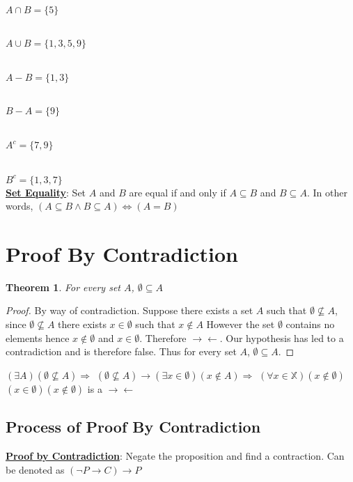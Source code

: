 \documentclass[12pt]{article}
\newtheorem{theorem}{Theorem}[section]
\newcommand{\defline}[2]{\noindent\textbf{\underline{#1}}: #2\\}
\newcommand{\contradiction}{$\rightarrow\leftarrow$}
\begin{document}
                \\$A \cap B = \{5\}$

                \\$A \cup B = \{1, 3, 5, 9\}$

                \\$A - B = \{1,3\}$

                \\$B - A = \{9\}$

                \\$A^c =\{7, 9\}$

                \\$B^c = \{1, 3,7\}$\\


            \defline{Set Equality}{Set $A$ and $B$ are equal if and only if $A\subseteq B$ and $B \subseteq A$. In other words, $(A\subseteq B \wedge B\subseteq A) \iff (A = B)$}

    \newpage

    \section{Proof By Contradiction}
        \begin{theorem}
            For every set $A$, $\emptyset\subseteq A$
        \end{theorem}
        \begin{proof}
            By way of contradiction.
            Suppose there exists a set $A$ such that $\emptyset\not\subseteq A$, since $\emptyset\not\subseteq A$ there exists $x\in\emptyset$ such that $x\notin A$
            However the set $\emptyset$ contains no elements hence $x\notin \emptyset$ and $x\in \emptyset$.
            Therefore \contradiction.
            Our hypothesis has led to a contradiction and is therefore false.
            Thus for every set $A$, $\emptyset\subseteq A$.
        \end{proof}
        \begin{outline}
            \1 $(\exists A)(\emptyset\not\subseteq A)\Rightarrow$
            \1 $(\emptyset\not\subseteq A)\rightarrow(\exists x\in \emptyset)(x\notin A)\Rightarrow$
            \1 $(\forall x\in \mathbb{X})(x\notin \emptyset)$
            \1 $(x\in \emptyset)(x\notin\emptyset)$ is a \contradiction
        \end{outline}
        \subsection{Process of Proof By Contradiction}
            \defline{Proof by Contradiction}{Negate the proposition and find a contraction.
            Can be denoted as $(\neg P \rightarrow C)\rightarrow P$}
\end{document}
